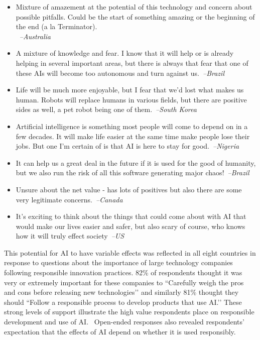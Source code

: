 \documentclass[sigconf]{acmart}
\newcommand\aff[1]{\textcolor{darkplum}{{\emph{--#1}}}}
\newcommand\q[1]{\textcolor{Mahogany}{\small{\textbf{}}}}
\newenvironment{lq2}
{ \begin{itemize}[leftmargin = 2.0em, rightmargin=1.0em, label={}]
    \fontsize{8.3pt}{8.9pt}\selectfont
\setlength{\itemsep}{3pt}
    \setlength{\parskip}{3pt}
    \setlength{\parsep}{3pt}     }
{ \end{itemize}                  }
\begin{document}
\begin{lq2}
\item Mixture of amazement at the potential of this technology and concern about possible pitfalls. Could be the start of something amazing or the beginning of the end (a la Terminator).\\~\aff{Australia}
\item A mixture of knowledge and fear. I know that it will help or is already helping in several important areas, but there is always that fear that one of these AIs will become too autonomous and turn against us.~\aff{Brazil}
\item Life will be much more enjoyable, but I fear that we'd lost what makes us human. Robots will replace humans in various fields, but there are positive sides as well, a pet robot being one of them.~\aff{South Korea}
\item Artificial intelligence is something most people will come to depend on in a few decades. It will make life easier at the same time make people lose their jobs. But one I'm certain of is that AI is here to stay for good.~\aff{Nigeria}
\item It can help us a great deal in the future if it is used for the good of humanity, but we also run the risk of all this software generating major chaos!~\aff{Brazil}
\item Unsure about the net value - has lots of positives but also there are some very legitimate concerns.~\aff{Canada}
\item It's exciting to think about the things that could come about with AI that would make our lives easier and safer, but also scary of course, who knows how it will truly effect society~\aff{US}
\end{lq2}

This potential for AI to have variable effects was reflected in all eight countries in response to questions about the importance of large technology companies following responsible innovation practices. 82\% of respondents thought it was very or extremely important for these companies to ``Carefully weigh the pros and cons before releasing new technologies’’ and similarly 81\% thought they should ``Follow a responsible process to develop products that use AI.’’ These strong levels of support illustrate the high value respondents place on responsible development and use of AI.~\q{Responsible Development} Open-ended responses also revealed respondents' expectation that the effects of AI depend on whether it is used responsibly.
\end{document}
